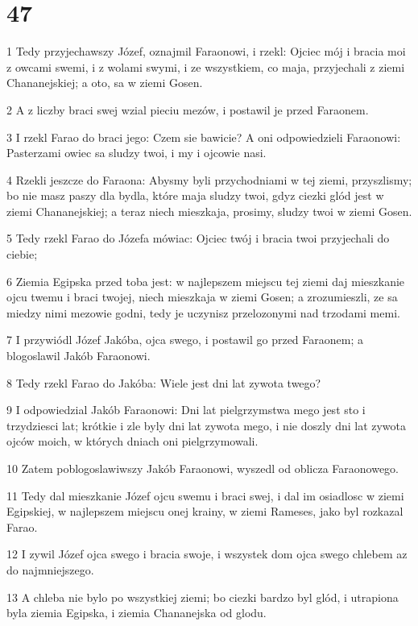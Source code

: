\chapter{47}

\par 1 Tedy przyjechawszy Józef, oznajmil Faraonowi, i rzekl: Ojciec mój i bracia moi z owcami swemi, i z wolami swymi, i ze wszystkiem, co maja, przyjechali z ziemi Chananejskiej; a oto, sa w ziemi Gosen.
\par 2 A z liczby braci swej wzial pieciu mezów, i postawil je przed Faraonem.
\par 3 I rzekl Farao do braci jego: Czem sie bawicie? A oni odpowiedzieli Faraonowi: Pasterzami owiec sa sludzy twoi, i my i ojcowie nasi.
\par 4 Rzekli jeszcze do Faraona: Abysmy byli przychodniami w tej ziemi, przyszlismy; bo nie masz paszy dla bydla, które maja sludzy twoi, gdyz ciezki glód jest w ziemi Chananejskiej; a teraz niech mieszkaja, prosimy, sludzy twoi w ziemi Gosen.
\par 5 Tedy rzekl Farao do Józefa mówiac: Ojciec twój i bracia twoi przyjechali do ciebie;
\par 6 Ziemia Egipska przed toba jest: w najlepszem miejscu tej ziemi daj mieszkanie ojcu twemu i braci twojej, niech mieszkaja w ziemi Gosen; a zrozumieszli, ze sa miedzy nimi mezowie godni, tedy je uczynisz przelozonymi nad trzodami memi.
\par 7 I przywiódl Józef Jakóba, ojca swego, i postawil go przed Faraonem; a blogoslawil Jakób Faraonowi.
\par 8 Tedy rzekl Farao do Jakóba: Wiele jest dni lat zywota twego?
\par 9 I odpowiedzial Jakób Faraonowi: Dni lat pielgrzymstwa mego jest sto i trzydziesci lat; krótkie i zle byly dni lat zywota mego, i nie doszly dni lat zywota ojców moich, w których dniach oni pielgrzymowali.
\par 10 Zatem poblogoslawiwszy Jakób Faraonowi, wyszedl od oblicza Faraonowego.
\par 11 Tedy dal mieszkanie Józef ojcu swemu i braci swej, i dal im osiadlosc w ziemi Egipskiej, w najlepszem miejscu onej krainy, w ziemi Rameses, jako byl rozkazal Farao.
\par 12 I zywil Józef ojca swego i bracia swoje, i wszystek dom ojca swego chlebem az do najmniejszego.
\par 13 A chleba nie bylo po wszystkiej ziemi; bo ciezki bardzo byl glód, i utrapiona byla ziemia Egipska, i ziemia Chananejska od glodu.

